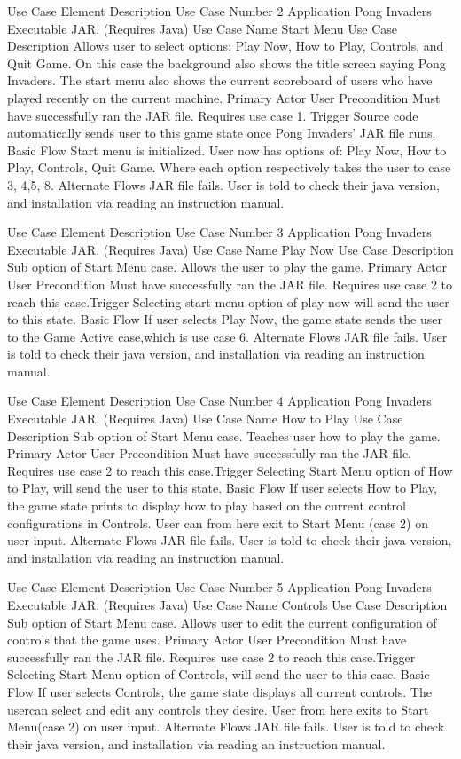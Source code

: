 \documentclass[12pt, titlepage]{article}
\begin{document}
Use Case Element
Description
Use Case Number
2
Application
Pong Invaders Executable JAR. (Requires Java)
Use Case Name
Start Menu
Use Case Description
Allows user to select options: Play Now, How to Play, Controls, and Quit Game.
On this case the background also shows the title screen saying Pong Invaders.
The start menu also shows the current scoreboard of users who have played
recently on the current machine.
Primary Actor
User 
Precondition
Must have successfully ran the JAR file. Requires use case 1.
Trigger
Source code automatically sends user to this game state once Pong Invaders’ JAR
file runs.
Basic Flow
Start menu is initialized. User now has options of: Play Now, How to Play,
Controls, Quit Game. Where each option respectively takes the user to case 3,
4,5, 8.
Alternate Flows
JAR file fails. User is told to check their java version, and installation via
reading an instruction manual.


Use Case Element
Description
Use Case Number
3
Application
Pong Invaders Executable JAR. (Requires Java)
Use Case Name
Play Now
Use Case Description
Sub option of Start Menu case. Allows the user to play the game.
Primary Actor
User 
Precondition
Must have successfully ran the JAR file. Requires use case 2 to reach this
case.Trigger
Selecting start menu option of play now will send the user to this state.
Basic Flow
If user selects Play Now, the game state sends the user to the Game Active
case,which is use case 6.
Alternate Flows
JAR file fails. User is told to check their java version, and installation via
reading an instruction manual.


Use Case Element
Description
Use Case Number
4
Application
Pong Invaders Executable JAR. (Requires Java)
Use Case Name
How to Play
Use Case Description
Sub option of Start Menu case. Teaches user how to play the game.
Primary Actor
User 
Precondition
Must have successfully ran the JAR file. Requires use case 2 to reach this
case.Trigger
Selecting Start Menu option of How to Play, will send the user to this state.
Basic Flow
If user selects How to Play, the game state prints to display how to play based
on the current control configurations in Controls. User can from here exit to
Start Menu (case 2) on user input.
Alternate Flows
JAR file fails. User is told to check their java version, and installation via
reading an instruction manual.


Use Case Element
Description
Use Case Number
5
Application
Pong Invaders Executable JAR. (Requires Java)
Use Case Name
Controls
Use Case Description
Sub option of Start Menu case. Allows user to edit the current configuration of
controls that the game uses.
Primary Actor
User 
Precondition
Must have successfully ran the JAR file. Requires use case 2 to reach this
case.Trigger
Selecting Start Menu option of Controls, will send the user to this case.
Basic Flow
If user selects Controls, the game state displays all current controls. The
usercan select and edit any controls they desire. User from here exits to Start
Menu(case 2) on user input.
Alternate Flows
JAR file fails. User is told to check their java version, and installation via
reading an instruction manual.
\end{document}
